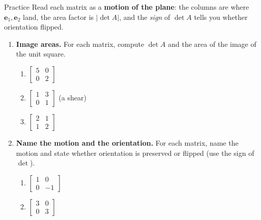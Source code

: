 \documentclass[10pt]{article}
\newcommand{\ee}{\mathbf{e}}
\begin{document}
\namedateperiod

\vspace{0.12in}

\begin{notesbox}{Practice}
Read each matrix as a \textbf{motion of the plane}: the columns are where $\ee_1,\ee_2$ land, the area
factor is $|\det A|$, and the \emph{sign} of $\det A$ tells you whether orientation flipped.

\begin{enumerate}[leftmargin=1.9em, itemsep=11pt]
  \item \textbf{Image areas.} For each matrix, compute $\det A$ and the area of the image of the unit square.
    \begin{enumerate}[label=(\alph*), leftmargin=1.8em, itemsep=5pt]
      \item $\begin{bmatrix} 5 & 0 \\ 0 & 2 \end{bmatrix}$ \hfill {}
      \item $\begin{bmatrix} 1 & 3 \\ 0 & 1 \end{bmatrix}$ \; {\footnotesize(a shear)} \hfill {}
      \item $\begin{bmatrix} 2 & 1 \\ 1 & 2 \end{bmatrix}$ \hfill {}
    \end{enumerate}
  \item \textbf{Name the motion and the orientation.} For each matrix, name the motion and state whether
        orientation is preserved or flipped (use the sign of $\det$).
    \begin{enumerate}[label=(\alph*), leftmargin=1.8em, itemsep=5pt]
      \item $\begin{bmatrix} 1 & 0 \\ 0 & -1 \end{bmatrix}$ \hfill {}
      \item $\begin{bmatrix} 3 & 0 \\ 0 & 3 \end{bmatrix}$ \hfill {}

\end{enumerate}
\end{enumerate}
\end{notesbox}
\end{document}
